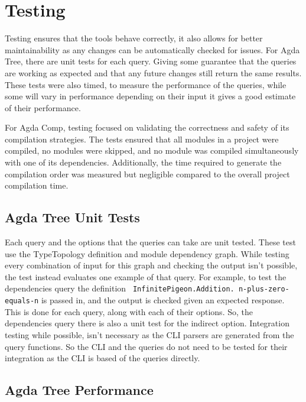 
\chapter{Testing}


Testing ensures that the tools behave correctly, it also allows for better
maintainability as any changes can be automatically checked for issues. For
Agda Tree, there are unit tests for each query. Giving some guarantee that the
queries are working as expected and that any future changes still return the
same results. These tests were also timed, to measure the performance of the
queries, while some will vary in performance depending on their input it gives
a good estimate of their performance.


For Agda Comp, testing focused on validating the correctness and safety of its
compilation strategies. The tests ensured that all modules in a project were
compiled, no modules were skipped, and no module was compiled simultaneously
with one of its dependencies. Additionally, the time required to generate the
compilation order was measured but negligible compared to the overall project
compilation time.


\section{Agda Tree Unit Tests}


Each query and the options that the queries can take are unit tested. These
test use the TypeTopology definition and module dependency graph. While testing
every combination of input for this graph and checking the output isn't
possible, the test instead evaluates one example of that query. For example, to
test the dependencies query the definition \texttt{ InfinitePigeon.Addition.
n-plus-zero-equals-n} is passed in, and the output is
checked given an expected response. This is done for each query, along with
each of their options. So, the dependencies query there is also a unit test
for the indirect option. Integration testing while possible, isn't necessary as
the CLI parsers are generated from the query functions. So the CLI and the
queries do not need to be tested for their integration as the CLI is based of
the queries directly. 

\section{Agda Tree Performance} \label{sub:agda tree performance}

